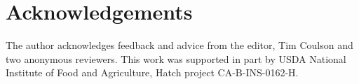 \documentclass[
  authoryear,
  preprint]{elsarticle}
\begin{document}
\section{Acknowledgements}\label{acknowledgements}

The author acknowledges feedback and advice from the editor, Tim Coulson
and two anonymous reviewers. This work was supported in part by USDA
National Institute of Food and Agriculture, Hatch project
CA-B-INS-0162-H.


\renewcommand\refname{References}
  
\end{document}
